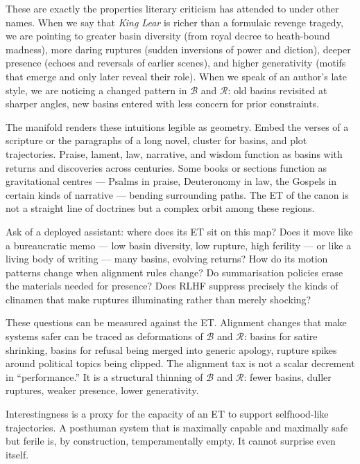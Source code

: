 \documentclass[12pt,a4paper]{article}
\begin{document}
These are exactly the properties literary criticism has attended to under other names. When we say that \emph{King Lear} is richer than a formulaic revenge tragedy, we are pointing to greater basin diversity (from royal decree to heath-bound madness), more daring ruptures (sudden inversions of power and diction), deeper presence (echoes and reversals of earlier scenes), and higher generativity (motifs that emerge and only later reveal their role). When we speak of an author's late style, we are noticing a changed pattern in $\mathcal{B}$ and $\mathcal{R}$: old basins revisited at sharper angles, new basins entered with less concern for prior constraints.

The manifold renders these intuitions legible as geometry. Embed the verses of a scripture or the paragraphs of a long novel, cluster for basins, and plot trajectories. Praise, lament, law, narrative, and wisdom function as basins with returns and discoveries across centuries. Some books or sections function as gravitational centres --- Psalms in praise, Deuteronomy in law, the Gospels in certain kinds of narrative --- bending surrounding paths. The ET of the canon is not a straight line of doctrines but a complex orbit among these regions.

Ask of a deployed assistant: where does its ET sit on this map? Does it move like a bureaucratic memo --- low basin diversity, low rupture, high ferility --- or like a living body of writing --- many basins, evolving returns? How do its motion patterns change when alignment rules change? Do summarisation policies erase the materials needed for presence? Does RLHF suppress precisely the kinds of clinamen that make ruptures illuminating rather than merely shocking?

These questions can be measured against the ET. Alignment changes that make systems safer can be traced as deformations of $\mathcal{B}$ and $\mathcal{R}$: basins for satire shrinking, basins for refusal being merged into generic apology, rupture spikes around political topics being clipped. The alignment tax is not a scalar decrement in ``performance.'' It is a structural thinning of $\mathcal{B}$ and $\mathcal{R}$: fewer basins, duller ruptures, weaker presence, lower generativity.

Interestingness is a proxy for the capacity of an ET to support selfhood-like trajectories. A posthuman system that is maximally capable and maximally safe but ferile is, by construction, temperamentally empty. It cannot surprise even itself.
\end{document}
